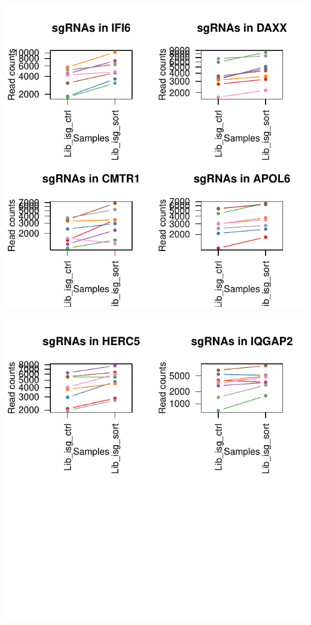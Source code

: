 \documentclass{article}
\begin{document}
\includegraphics{MageckLibISG_CoVclust_summary-011}
%


\includegraphics{MageckLibISG_CoVclust_summary-012}
\end{document}
